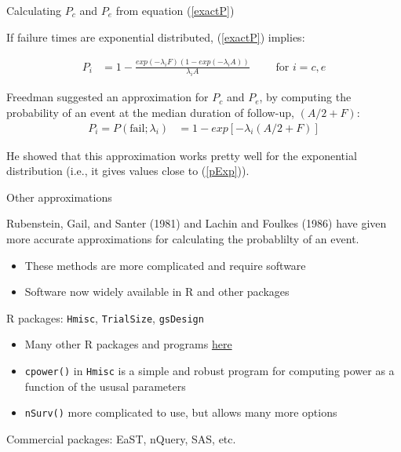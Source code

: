\documentclass[ignorenonframetext,]{beamer}
\begin{document}
\begin{frame}{%
\protect\hypertarget{calculating-p_c-and-p_e-from-equation}{%
Calculating \(P_c\) and \(P_e\) from equation (\ref{exactP})}}

If failure times are exponential distributed, (\ref{exactP}) implies:

\begin{align} \label{pExp}
P_i &= 1 - \frac{exp(-\lambda_i F) (1-exp(-\lambda_i A))}{\lambda_i A} \qquad \text{ for } i = c, e 
\end{align}

Freedman suggested an approximation for \(P_c\) and \(P_e\), by
computing the probability of an event at the median duration of
follow-up, \((A/2 + F)\): \begin{align*}
P_i = P(\text{fail};\lambda_i) &= 1 - exp[-\lambda_i (A/2 + F)]
\end{align*}

He showed that this approximation works pretty well for the exponential
distribution (i.e., it gives values close to (\ref{pExp})).

\end{frame}

\begin{frame}{%
\protect\hypertarget{other-approximations}{%
Other approximations}}

Rubenstein, Gail, and Santer (1981) and Lachin and Foulkes (1986) have
given more accurate approximations for calculating the probablilty of an
event.

\begin{itemize}
\item
  These methods are more complicated and require software
\item
  Software now widely available in \textsf{R} and other packages
\end{itemize}

\textsf{R} packages: \texttt{Hmisc}, \texttt{TrialSize},
\texttt{gsDesign}

\begin{itemize}
\item
  Many other \textsf{R} packages and programs
  \href{https://cran.r-project.org/web/views/ClinicalTrials.html}{here}
\item
  \texttt{cpower()} in \texttt{Hmisc} is a simple and robust program for
  computing power as a function of the ususal parameters
\item
  \texttt{nSurv()} more complicated to use, but allows many more options
\end{itemize}

Commercial packages: EaST, nQuery, SAS, etc.

\end{frame}
\end{document}
